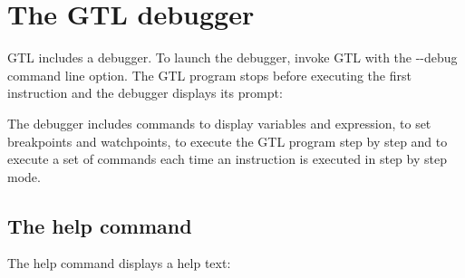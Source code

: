 \documentclass[10pt,openright,twosides,final]{memoir}
\begin{document}
\chapter{The GTL debugger}

GTL includes a debugger. To launch the debugger, invoke GTL with the {\ttfamily\footnotesize {-}-debug} command line option. The GTL program stops before executing the first instruction and the debugger displays its prompt:

\vspace{1em}
\noindent
{}
\vspace{1em}

The debugger includes commands to display variables and expression, to set breakpoints and watchpoints, to execute the GTL program step by step and to execute a set of commands each time an instruction is executed in step by step mode.

\section{The help command}

The help command displays a help text:
\end{document}
